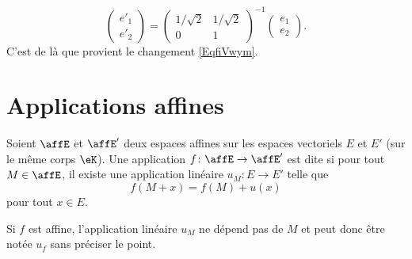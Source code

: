 \begin{example}
    \begin{equation}
        \begin{pmatrix}
            e'_1    \\ 
            e'_2    
        \end{pmatrix}=\begin{pmatrix}
            1/\sqrt{2}    &   1/\sqrt{2}    \\ 
            0    &   1    
        \end{pmatrix}^{-1}\begin{pmatrix}
            e_1    \\ 
            e_2    
        \end{pmatrix}.
    \end{equation}
    C'est de là que provient le changement \eqref{EqfiVwym}.
\end{example}

\section{Applications affines}

\begin{definition}      \label{DEFooUAWZooXcMKve}
    Soient \( \affE\) et \( \affE'\) deux espaces affines sur les espaces vectoriels \( E\) et \( E'\) (sur le même corps \( \eK\)). Une application \( f\colon \affE\to \affE'\) est dite  si pour tout \( M\in \affE\), il existe une application linéaire \( u_M\colon E\to E'\) telle que 
    \begin{equation}    \label{EqMqIoWX}
        f(M+x)=f(M)+u(x)
    \end{equation}
    pour tout \( x\in E\).
\end{definition}

\begin{lemma}       \label{LEMooYJCDooOGAHkF}
    Si \( f\) est affine, l'application linéaire \( u_M\) ne dépend pas de \( M\) et peut donc être notée \( u_f\) sans préciser le point.
\end{lemma}

